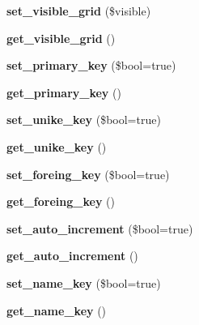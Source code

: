 \begin{DoxyCompactItemize}
\item 
\mbox{\label{class_column_a81a3179f6cfb539a346089975a482da5}} 
{\bfseries set\+\_\+visible\+\_\+grid} (\$visible)
\item 
\mbox{\label{class_column_a1ebf50eb00d5c65b0087cf13c1ceb8fd}} 
{\bfseries get\+\_\+visible\+\_\+grid} ()
\item 
\mbox{\label{class_column_a58d41e83c8ef7f3a021e1070f2e98cd3}} 
{\bfseries set\+\_\+primary\+\_\+key} (\$bool=true)
\item 
\mbox{\label{class_column_a596352fac897c8f8a877a67ab390df76}} 
{\bfseries get\+\_\+primary\+\_\+key} ()
\item 
\mbox{\label{class_column_afc2755d3457a6f80517b6ba695e793cf}} 
{\bfseries set\+\_\+unike\+\_\+key} (\$bool=true)
\item 
\mbox{\label{class_column_adc97cb771ea70684dcb2ff4591880418}} 
{\bfseries get\+\_\+unike\+\_\+key} ()
\item 
\mbox{\label{class_column_a5ec7cacb0cd684328df7e04a9bf1e891}} 
{\bfseries set\+\_\+foreing\+\_\+key} (\$bool=true)
\item 
\mbox{\label{class_column_a43e6f982df392a8497bce9869142e66c}} 
{\bfseries get\+\_\+foreing\+\_\+key} ()
\item 
\mbox{\label{class_column_a32c16aaa4042527777de5b48754c3fbd}} 
{\bfseries set\+\_\+auto\+\_\+increment} (\$bool=true)
\item 
\mbox{\label{class_column_ac3da460a7c41cfc906f2ea3e8b37280f}} 
{\bfseries get\+\_\+auto\+\_\+increment} ()
\item 
\mbox{\label{class_column_a8ecb11e158dea1d54dd042c593e96f0e}} 
{\bfseries set\+\_\+name\+\_\+key} (\$bool=true)
\item 
\mbox{\label{class_column_afbe92323031606a80891038f2a833e37}} 
{\bfseries get\+\_\+name\+\_\+key} ()
\item 

\end{DoxyCompactItemize}
